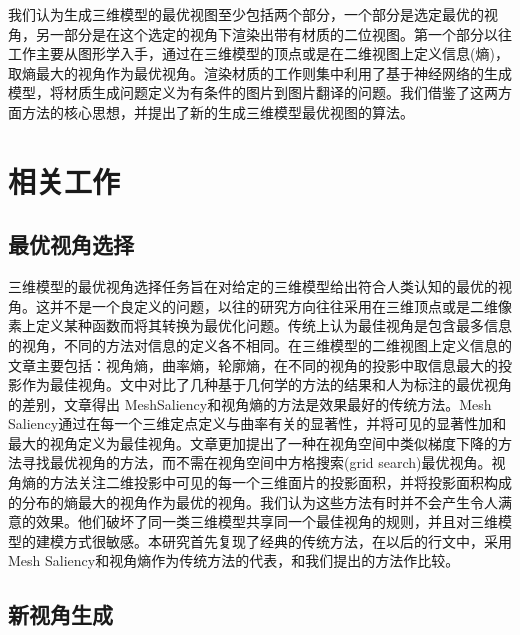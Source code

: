 \documentclass[UTF8,openany,AutoFakeBold,AutoFakeSlant,cs4size]{ctexbook}
\begin{document}
我们认为生成三维模型的最优视图至少包括两个部分，一个部分是选定最优的视角，另一部分是在这个选定的视角下渲染出带有材质的二位视图。第一个部分以往工作主要从图形学入手，通过在三维模型的顶点或是在二维视图上定义信息(熵)，取熵最大的视角作为最优视角。渲染材质的工作则集中利用了基于神经网络的生成模型，将材质生成问题定义为有条件的图片到图片翻译的问题。我们借鉴了这两方面方法的核心思想，并提出了新的生成三维模型最优视图的算法。

\section{相关工作}

\subsection{最优视角选择}

三维模型的最优视角选择任务旨在对给定的三维模型给出符合人类认知的最优的视角。这并不是一个良定义的问题，以往的研究方向往往采用在三维顶点或是二维像素上定义某种函数而将其转换为最优化问题。传统上认为最佳视角是包含最多信息的视角，不同的方法对信息的定义各不相同。在三维模型的二维视图上定义信息的文章主要包括：视角熵\cite{Vzquez2003AutomaticVS}，曲率熵\cite{Page2003ShapeAA}，轮廓熵\cite{Page2003ShapeAA}，在不同的视角的投影中取信息最大的投影作为最佳视角。\cite{Dutagaci2010ABF}文中对比了几种基于几何学的方法的结果和人为标注的最优视角的差别，文章得出 MeshSaliency\cite{Lee2005MeshS}和视角熵\cite{Vzquez2003AutomaticVS}的方法是效果最好的传统方法。Mesh Saliency\cite{Lee2005MeshS}通过在每一个三维定点定义与曲率有关的显著性，并将可见的显著性加和最大的视角定义为最佳视角。文章更加提出了一种在视角空间中类似梯度下降的方法寻找最优视角的方法，而不需在视角空间中方格搜索(grid search)最优视角。视角熵\cite{Vzquez2003AutomaticVS}的方法关注二维投影中可见的每一个三维面片的投影面积，并将投影面积构成的分布的熵最大的视角作为最优的视角。我们认为这些方法有时并不会产生令人满意的效果。他们破坏了同一类三维模型共享同一个最佳视角的规则，并且对三维模型的建模方式很敏感。本研究首先复现了经典的传统方法，在以后的行文中，采用Mesh Saliency和视角熵作为传统方法的代表，和我们提出的方法作比较。

\subsection{新视角生成}
\end{document}
